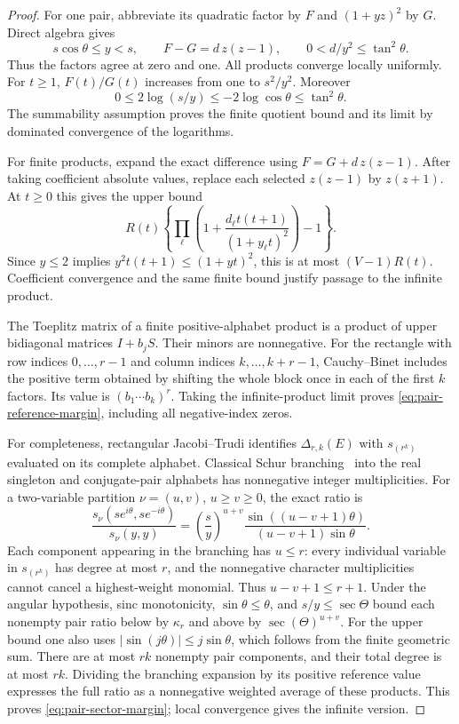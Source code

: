 \begin{proof}
For one pair, abbreviate its quadratic factor by $F$ and $(1+yz)^2$
by $G$. Direct algebra gives
\[
 s\cos\theta\le y<s,\qquad
 F-G=d\,z(z-1),\qquad 0<d/y^2\le\tan^2\theta.
\]
Thus the factors agree at zero and one. All products converge locally
uniformly. For $t\ge1$, $F(t)/G(t)$ increases from one to $s^2/y^2$.
Moreover
\[
 0\le2\log(s/y)\le-2\log\cos\theta\le\tan^2\theta.
\]
The summability assumption proves the finite quotient bound and its
limit by dominated convergence of the logarithms.

For finite products, expand the exact difference using
$F=G+d\,z(z-1)$. After taking coefficient absolute values, replace each
selected $z(z-1)$ by $z(z+1)$. At $t\ge0$ this gives the upper bound
\[
 R(t)\left\{\prod_\ell
 \left(1+\frac{d_\ell t(t+1)}{(1+y_\ell t)^2}\right)-1\right\}.
\]
Since $y\le2$ implies $y^2t(t+1)\le(1+yt)^2$, this is at most
$(V-1)R(t)$. Coefficient convergence and the same finite bound justify
passage to the infinite product.

The Toeplitz matrix of a finite positive-alphabet product is a product
of upper bidiagonal matrices $I+b_jS$. Their minors are nonnegative.
For the rectangle with row indices $0,\ldots,r-1$ and column indices
$k,\ldots,k+r-1$, Cauchy--Binet includes the positive term obtained by
shifting the whole block once in each of the first $k$ factors. Its
value is $(b_1\cdots b_k)^r$. Taking the infinite-product limit proves
\eqref{eq:pair-reference-margin}, including all negative-index zeros.

For completeness, rectangular Jacobi--Trudi identifies
$\Delta_{r,k}(E)$ with $s_{(r^k)}$ evaluated on its complete alphabet.
Classical Schur branching~\cite{EtingofRepresentationTheory20110110} into the real singleton and conjugate-pair
alphabets has nonnegative integer multiplicities. For a two-variable
partition $\nu=(u,v)$, $u\ge v\ge0$, the exact ratio is
\[
 \frac{s_\nu(se^{i\theta},se^{-i\theta})}{s_\nu(y,y)}
 =\left(\frac{s}{y}\right)^{u+v}
   \frac{\sin((u-v+1)\theta)}{(u-v+1)\sin\theta}.
\]
Each component appearing in the branching has $u\le r$: every
individual variable in $s_{(r^k)}$ has degree at most $r$, and the
nonnegative character multiplicities cannot cancel a highest-weight
monomial. Thus $u-v+1\le r+1$. Under the angular hypothesis, sinc
monotonicity, $\sin\theta\le\theta$, and $s/y\le\sec\Theta$ bound
each nonempty pair ratio below by $\kappa_r$ and above by
$\sec(\Theta)^{u+v}$. For the upper bound one also uses
$|\sin(j\theta)|\le j\sin\theta$, which follows from the finite
geometric sum. There are at most $rk$ nonempty pair components, and
their total degree is at most $rk$. Dividing the branching expansion
by its positive reference value expresses the full ratio as a
nonnegative weighted average of these products. This proves
\eqref{eq:pair-sector-margin}; local convergence gives the infinite
version.
\end{proof}

